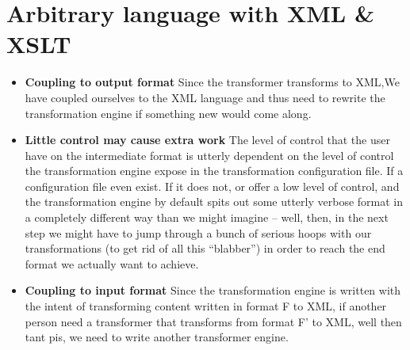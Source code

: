 \documentclass{article}
\begin{document}
\section{Arbitrary language with XML \& XSLT}
\begin{itemize}
\item \textbf{Coupling to output format} Since the transformer transforms to XML,We have coupled ourselves to the XML language and thus need to rewrite the transformation engine if something new would come along.
\item \textbf{Little control may cause extra work} The level of control that the user have on the intermediate format is utterly dependent on the level of control the transformation engine expose in the transformation configuration file. If a configuration file even exist. If it does not, or offer a low level of control, and the transformation engine by default spits out some utterly verbose format in a completely different way than we might imagine -- well, then, in the next step we might have to jump through a bunch of serious hoops with our transformations (to get rid of all this ``blabber'') in order to reach the end format we actually want to achieve. 
\item \textbf{Coupling to input format} Since the transformation engine is written with the intent of transforming content written in format F to XML, if another person need a transformer that transforms from format F' to XML, well then tant pis, we need to write another transformer engine.
\end{itemize}
\end{document}
